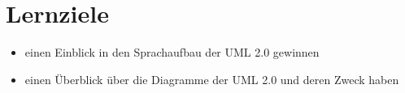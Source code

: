 \section{Lernziele}
\begin{itemize}
    \item einen Einblick in den Sprachaufbau der UML 2.0 gewinnen
    \item einen Überblick über die Diagramme der UML 2.0 und deren Zweck haben
\end{itemize}